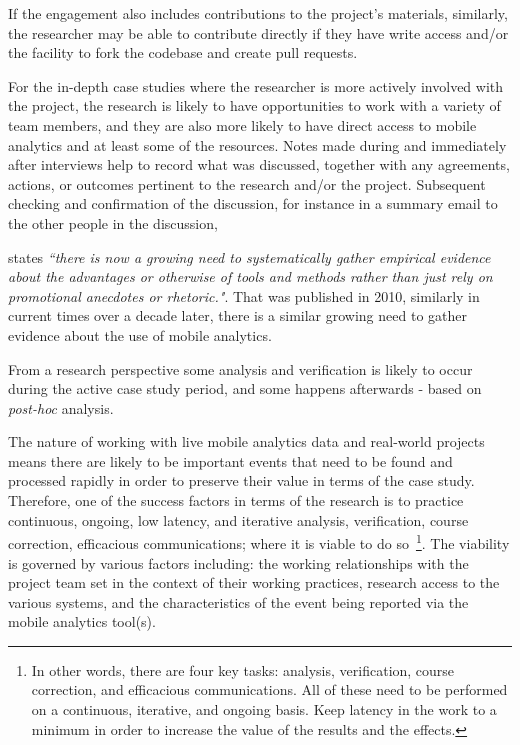 If the engagement also includes contributions to the project's materials, similarly, the researcher may be able to contribute directly if they have write access and/or the facility to fork the codebase and create pull requests.

For the in-depth case studies where the researcher is more actively involved with the project, the research is likely to have opportunities to work with a variety of team members, and they are also more likely to have direct access to mobile analytics and at least some of the resources. Notes made during and immediately after interviews help to record what was discussed, together with any agreements, actions, or outcomes pertinent to the research and/or the project. Subsequent checking and confirmation of the discussion, for instance in a summary email to the other people in the discussion, 

\citet[p.250]{falessi2010_applying_ESE_to_sw_architecture_etc} states \emph{``there is now a growing need to systematically gather empirical evidence about the advantages or otherwise of tools and methods rather than just rely on promotional anecdotes or rhetoric."}. That was published in 2010, similarly in current times over a decade later, there is a similar growing need to gather evidence about the use of mobile analytics.


From a research perspective some analysis and verification is likely to occur during the active case study period, and some happens afterwards - based on \emph{post-hoc} analysis.

The nature of working with live mobile analytics data and real-world projects means there are likely to be important events that need to be found and processed rapidly in order to preserve their value in terms of the case study. Therefore, one of the success factors in terms of the research is to practice continuous, ongoing, low latency, and iterative analysis, verification, course correction, efficacious communications; where it is viable to do so~\footnote{In other words, there are four key tasks: analysis, verification, course correction, and efficacious communications. All of these need to be performed on a continuous, iterative, and ongoing basis. Keep latency in the work to a minimum in order to increase the value of the results and the effects.}. The viability is governed by various factors including: the working relationships with the project team set in the context of their working practices, research access to the various systems, and the characteristics of the event being reported via the mobile analytics tool(s). 


